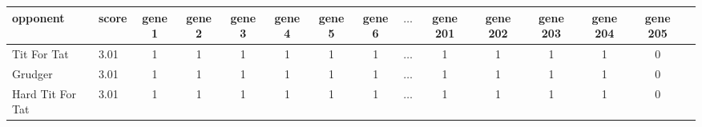 \begin{tabular}{llccccccccccccc}
\toprule
opponent &  score &  gene 1 &  gene 2 &  gene 3 &  gene 4 &  gene 5 &  gene 6 &  \(\dots\) & gene 201 &  gene 202 &  gene 203 &  gene 204 &  gene 205 \\
\midrule
     Tit For Tat &   3.01 &       1 &       1 &       1 &       1 &       1 &       1 & \(\dots\) &      1 &         1 &         1 &         1 &         0 \\
         Grudger &   3.01 &       1 &       1 &       1 &       1 &       1 &       1 & \(\dots\) &      1 &         1 &         1 &         1 &         0 \\
Hard Tit For Tat &   3.01 &       1 &       1 &       1 &       1 &       1 &       1 & \(\dots\) &      1 &         1 &         1 &         1 &         0 \\
\bottomrule
\end{tabular}
